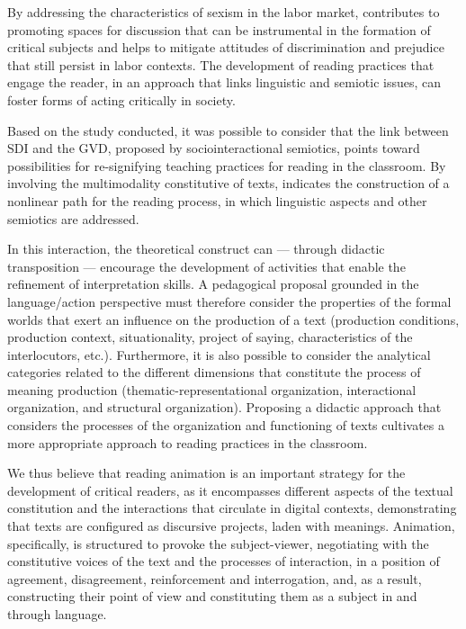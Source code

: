 \documentclass[english]{textolivre}
\begin{document}
By addressing the characteristics of sexism in the labor market, \textcite{purl} contributes to promoting spaces for discussion that can be instrumental in the formation of critical subjects and helps to mitigate attitudes of discrimination and prejudice that still persist in labor contexts. The development of reading practices that engage the reader, in an approach that links linguistic and semiotic issues, can foster forms of acting critically in society. 

Based on the study conducted, it was possible to consider that the link between SDI and the GVD, proposed by sociointeractional semiotics, points toward possibilities for re-signifying teaching practices for reading in the classroom. By involving the multimodality constitutive of texts, \textcite{leal2011organizaccao} indicates the construction of a nonlinear path for the reading process, in which linguistic aspects and other semiotics are addressed. 

In this interaction, the theoretical construct can — through didactic transposition — encourage the development of activities that enable the refinement of interpretation skills. A pedagogical proposal grounded in the language/action perspective must therefore consider the properties of the formal worlds that exert an influence on the production of a text (production conditions, production context, situationality, project of saying, characteristics of the interlocutors, etc.). Furthermore, it is also possible to consider the analytical categories related to the different dimensions that constitute the process of meaning production (thematic-representational organization, interactional organization, and structural organization). Proposing a didactic approach that considers the processes of the organization and functioning of texts cultivates a more appropriate approach to reading practices in the classroom. 

We thus believe that reading animation is an important strategy for the development of critical readers, as it encompasses different aspects of the textual constitution and the interactions that circulate in digital contexts, demonstrating that texts are configured as discursive projects, laden with meanings. Animation, specifically, is structured to provoke the subject-viewer, negotiating with the constitutive voices of the text and the processes of interaction, in a position of agreement, disagreement, reinforcement and interrogation, and, as a result, constructing their point of view and constituting them as a subject in and through language.
\end{document}
